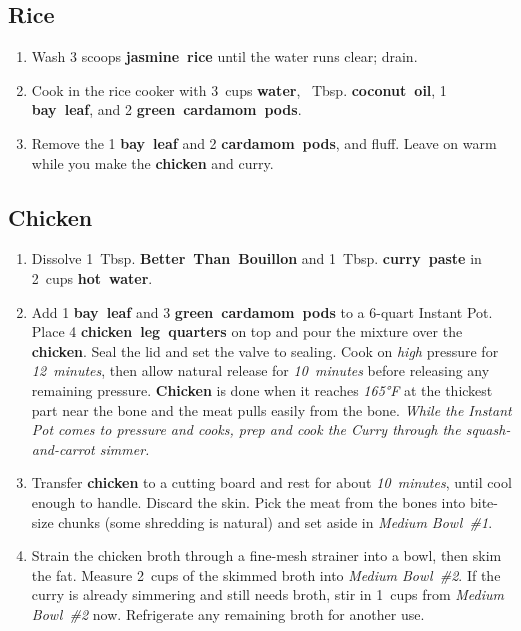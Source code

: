 \documentclass[11pt,letterpaper]{article}
\begin{document}
\subsection*{Rice}

\begin{enumerate}
    \item  Wash 3 scoops \textbf{jasmine~rice} until the water runs clear; drain.
    \item  Cook in the rice cooker with 3~cups \textbf{water}, ~Tbsp. \textbf{coconut~oil}, 1 \textbf{bay~leaf}, and 2 \textbf{green~cardamom~pods}.
    \item Remove the 1 \textbf{bay~leaf} and 2 \textbf{cardamom~pods}, and fluff. Leave on warm while you make the \textbf{chicken} and curry.
\end{enumerate}


\subsection*{Chicken}

\begin{enumerate}
    \item Dissolve 1~Tbsp. \textbf{Better~Than~Bouillon} and 1~Tbsp. \textbf{curry~paste} in 2~cups \textbf{hot~water}.

    \item Add 1 \textbf{bay~leaf} and 3 \textbf{green~cardamom~pods} to a 6-quart Instant Pot. Place 4 \textbf{chicken~leg~quarters} on top and pour the mixture over the \textbf{chicken}. Seal the lid and set the valve to sealing. Cook on \textit{high} pressure for \textit{12~minutes}, then allow natural release for \textit{10~minutes} before releasing any remaining pressure. \textbf{Chicken} is done when it reaches \textit{165°F} at the thickest part near the bone and the meat pulls easily from the bone. \textit{While the Instant Pot comes to pressure and cooks, prep and cook the Curry through the squash-and-carrot simmer.}

    \item Transfer \textbf{chicken} to a cutting board and rest for about \textit{10~minutes}, until cool enough to handle. Discard the skin. Pick the meat from the bones into bite-size chunks (some shredding is natural) and set aside in \textit{Medium Bowl~\#1}.

    \item Strain the chicken broth through a fine-mesh strainer into a bowl, then skim the fat. Measure 2~cups of the skimmed broth into \textit{Medium Bowl~\#2}. If the curry is already simmering and still needs broth, stir in 1~cups from \textit{Medium Bowl~\#2} now. Refrigerate any remaining broth for another use.
\end{enumerate}
\end{document}
